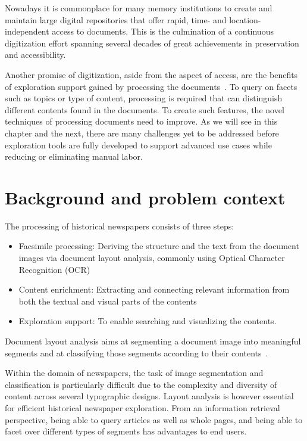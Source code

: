 \documentclass[oneside, english, bibtex]{kththesis}
\begin{document}
Nowadays it is commonplace for many memory institutions to create and maintain large digital repositories that offer rapid, time- and location-independent access to documents.
This is the culmination of a continuous digitization effort spanning several decades of great achievements in preservation and accessibility.

Another promise of digitization, aside from the aspect of access, are the benefits of exploration support gained by processing the documents~\cite{jdmdh:7097}.
To query on facets such as topics or type of content, processing is required that can distinguish different contents found in the documents.
To create such features, the novel techniques of processing documents need to improve.
As we will see in this chapter and the next, there are many challenges yet to be addressed before exploration tools are fully developed to support advanced use cases while reducing or eliminating manual labor.


\section{Background and problem context}
\label{sec:background}

The processing of historical newspapers consists of three steps:
\begin{itemize}
\item Facsimile processing: Deriving the structure and the text from the document images via document layout analysis, commonly using Optical Character Recognition (\gls{OCR})
\item Content enrichment: Extracting and connecting relevant information from both the textual and visual parts of the contents
\item Exploration support: To enable searching and visualizing the contents.
\end{itemize}

Document layout analysis aims at segmenting a document image into meaningful segments and at classifying those segments according to their contents~\cite{ESKENAZI20171}.

Within the domain of newspapers, the task of image segmentation and classification is particularly difficult due to the complexity and diversity of content across several typographic designs.
Layout analysis is however essential for efficient historical newspaper exploration.
From an information retrieval perspective, being able to query articles as well as whole pages, and being able to facet over different types of segments has advantages to end users.
\end{document}
